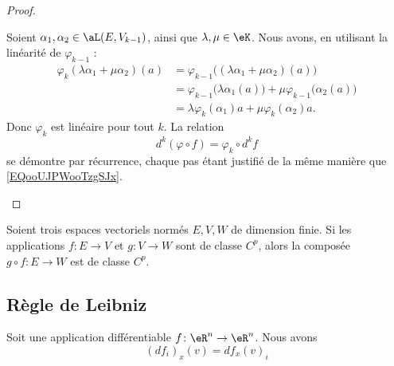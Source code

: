 \begin{proof}
	\begin{subproof}
		Soient \( \alpha_1,\alpha_2\in \aL(E,V_{k-1})\), ainsi que \( \lambda,\mu\in \eK\). Nous avons, en utilisant la linéarité de \( \varphi_{k-1}\) :
		\begin{subequations}
			\begin{align}
				\varphi_k(\lambda\alpha_1+\mu\alpha_2)(a) & =\varphi_{k-1}\big( (\lambda\alpha_1+\mu\alpha_2)(a) \big)                          \\
				                                          & =\varphi_{k-1}\big(\lambda \alpha_1(a)\big)+\mu\varphi_{k-1}\big( \alpha_2(a) \big) \\
				                                          & =\lambda\varphi_k(\alpha_1)a+\mu\varphi_k(\alpha_2)a.
			\end{align}
		\end{subequations}
		Donc \( \varphi_k\) est linéaire pour tout \( k\).
		\spitem[La relation]
		La relation
		\begin{equation}
			d^k(\varphi\circ f)=\varphi_k\circ d^kf
		\end{equation}
		se démontre par récurrence, chaque pas étant justifié de la même manière que \eqref{EQooUJPWooTzgSJx}.
	\end{subproof}
\end{proof}

\begin{proposition}[Composition]		\label{PROPooLRRMooRzrTNE}
	Soient trois espaces vectoriels normés \( E,V,W\) de dimension finie. Si les applications \(f \colon E\to V  \) et \( g \colon V\to W  \) sont de classe \( C^p\), alors la composée \(g\circ f \colon E\to W  \) est de classe \( C^p\).
\end{proposition}

\ssdem

\subsection{Règle de Leibniz}

\begin{proposition}	\label{PROPooNUAJooMtJByS}
	Soit une application différentiable \(f \colon \eR^n\to \eR^n  \). Nous avons
	\begin{equation}
		(df_i)_x(v)=df_x(v)_i
	\end{equation}
\end{proposition}



